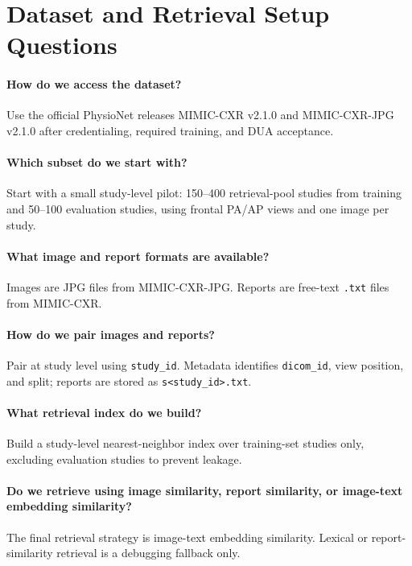 \documentclass[11pt]{article}
\begin{document}



\appendix

\section{Dataset and Retrieval Setup Questions}

\paragraph{How do we access the dataset?}
Use the official PhysioNet releases MIMIC-CXR v2.1.0 and MIMIC-CXR-JPG v2.1.0 after credentialing, required training, and DUA acceptance.

\paragraph{Which subset do we start with?}
Start with a small study-level pilot: 150--400 retrieval-pool studies from training and 50--100 evaluation studies, using frontal PA/AP views and one image per study.

\paragraph{What image and report formats are available?}
Images are JPG files from MIMIC-CXR-JPG. Reports are free-text \texttt{.txt} files from MIMIC-CXR.

\paragraph{How do we pair images and reports?}
Pair at study level using \texttt{study\_id}. Metadata identifies \texttt{dicom\_id}, view position, and split; reports are stored as \texttt{s<study\_id>.txt}.

\paragraph{What retrieval index do we build?}
Build a study-level nearest-neighbor index over training-set studies only, excluding evaluation studies to prevent leakage.

\paragraph{Do we retrieve using image similarity, report similarity, or image-text embedding similarity?}
The final retrieval strategy is image-text embedding similarity. Lexical or report-similarity retrieval is a debugging fallback only.
\end{document}
